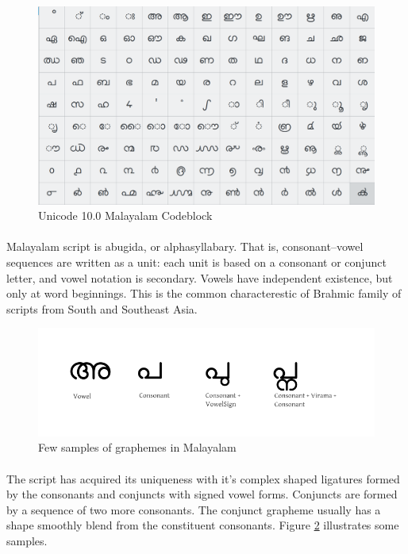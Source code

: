 \documentclass[10pt]{article}
\begin{document}
\begin{figure}[h!]
	\centering
	\includegraphics[scale=0.2]{images/unicodeml.png}
	\caption{Unicode 10.0 Malayalam Codeblock}
	\label{unicode}
\end{figure} 


\paragraph{}
Malayalam script is abugida, or alphasyllabary. That is, consonant–vowel sequences are written as a unit: each unit is based on a consonant or conjunct letter, and vowel notation is secondary. Vowels have independent existence, but only at word beginnings. This is the common characterestic of Brahmic family of scripts from South and Southeast Asia.


\begin{figure}[h!]
	\centering
	\includegraphics[scale=0.4]{images/malayalamExamples.png}
	\caption{Few samples of graphemes in Malayalam}
	\label{malayalamsamples}
\end{figure} 


\paragraph{}
The script has acquired its uniqueness with it's complex shaped ligatures formed by the consonants and conjuncts with signed vowel forms. Conjuncts are formed by a sequence of two more consonants. The conjunct grapheme usually has a shape smoothly blend from the constituent consonants. Figure \ref{malayalamsamples} illustrates some samples.
\end{document}
